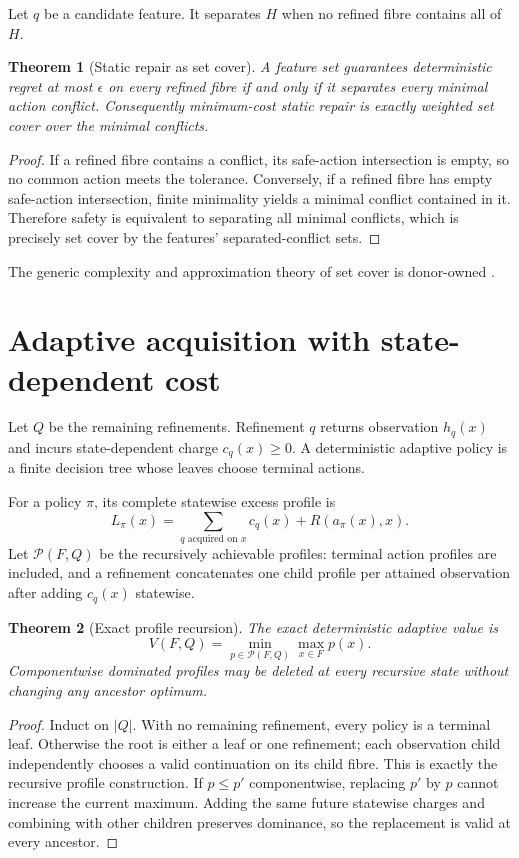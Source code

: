 \documentclass[11pt]{article}
\newtheorem{theorem}{Theorem}
\theoremstyle{definition}
\theoremstyle{remark}
\newcommand{\Pcal}{\mathcal P}
\begin{document}
Let $q$ be a candidate feature.  It separates $H$ when no refined fibre contains all of $H$.

\begin{theorem}[Static repair as set cover]\label{thm:setcover}
A feature set guarantees deterministic regret at most $\epsilon$ on every refined fibre if and only if it separates every minimal action conflict.  Consequently minimum-cost static repair is exactly weighted set cover over the minimal conflicts.
\end{theorem}
\begin{proof}
If a refined fibre contains a conflict, its safe-action intersection is empty, so no common action meets the tolerance.  Conversely, if a refined fibre has empty safe-action intersection, finite minimality yields a minimal conflict contained in it.  Therefore safety is equivalent to separating all minimal conflicts, which is precisely set cover by the features' separated-conflict sets.
\end{proof}

The generic complexity and approximation theory of set cover is donor-owned \citep{karp1972reducibility,chvatal1979greedy}.

\section{Adaptive acquisition with state-dependent cost}

Let $Q$ be the remaining refinements.  Refinement $q$ returns observation $h_q(x)$ and incurs state-dependent charge $c_q(x)\ge0$.  A deterministic adaptive policy is a finite decision tree whose leaves choose terminal actions.

For a policy $\pi$, its complete statewise excess profile is
\[
 L_\pi(x)=\sum_{q\text{ acquired on }x}c_q(x)+R(a_\pi(x),x).
\]
Let $\Pcal(F,Q)$ be the recursively achievable profiles: terminal action profiles are included, and a refinement concatenates one child profile per attained observation after adding $c_q(x)$ statewise.

\begin{theorem}[Exact profile recursion]\label{thm:profile}
The exact deterministic adaptive value is
\[
 V(F,Q)=\min_{p\in\Pcal(F,Q)}\max_{x\in F}p(x).
\]
Componentwise dominated profiles may be deleted at every recursive state without changing any ancestor optimum.
\end{theorem}
\begin{proof}
Induct on $|Q|$.  With no remaining refinement, every policy is a terminal leaf.  Otherwise the root is either a leaf or one refinement; each observation child independently chooses a valid continuation on its child fibre.  This is exactly the recursive profile construction.  If $p\le p'$ componentwise, replacing $p'$ by $p$ cannot increase the current maximum.  Adding the same future statewise charges and combining with other children preserves dominance, so the replacement is valid at every ancestor.
\end{proof}
\end{document}
